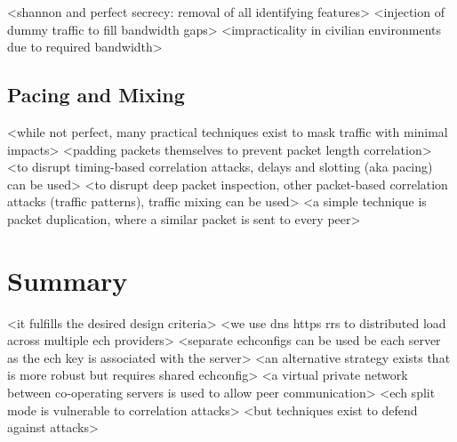 <shannon and perfect secrecy: removal of all identifying features>
<injection of dummy traffic to fill bandwidth gaps>
<impracticality in civilian environments due to required bandwidth>

\subsection{Pacing and Mixing}

<while not perfect, many practical techniques exist to mask traffic with minimal impacts>
<padding packets themselves to prevent packet length correlation>
\cite{yu2012predicted}
<to disrupt timing-based correlation attacks, delays and slotting (aka pacing) can be used>
<to disrupt deep packet inspection, other packet-based correlation attacks (traffic patterns), traffic mixing can be used>
\cite{fu2003analytical, fu2003effectiveness}
<a simple technique is packet duplication, where a similar packet is sent to every peer>






\section{Summary}

<it fulfills the desired design criteria>
<we use dns https rrs to distributed load across multiple ech providers>
<separate echconfigs can be used be each server as the ech key is associated with the server>
<an alternative strategy exists that is more robust but requires shared echconfig>
<a virtual private network between co-operating servers is used to allow peer communication>
<ech split mode is vulnerable to correlation attacks>
<but techniques exist to defend against attacks>

